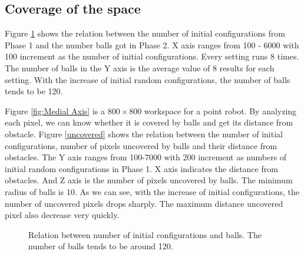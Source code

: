 \documentclass[11pt]{article}
\begin{document}
\subsection{Coverage of the space}

\indent\indent Figure \ref{PvB} shows the relation between the number of initial configurations from Phase 1 and the number balls got in Phase 2. X axis ranges from  100 - 6000 with 100 increment as the number of initial configurations. Every setting runs 8 times. The number of balls in the Y axis is the average value of 8 results for each setting. With the increase of initial random configurations, the number of balls tends to be 120. 

\indent Figure \ref{fig:Medial Axis} is a $800\times 800$ workspace for a point robot. By analyzing each pixel, we can know whether it is covered by balls and get its distance from obstacle. Figure \ref{uncovered} shows the relation between the number of initial configurations, number of pixels uncovered by balls and their distance from obstacles. The Y axis ranges from 100-7000 with 200 increment as numbers of initial random configurations in Phase 1. X axis indicates the distance from obstacles. And Z axis is the number of pixels uncovered by balls. The minimum radius of balls is 10. As we can see, with the increase of initial configurations, the number of uncovered pixels drops sharply. The maximum distance uncovered pixel also decrease very quickly.

\begin{figure}
	\caption{\label{PvB}} Relation between number of initial configurations and balls. The number of balls tends to be around 120.
\end{figure}
\end{document}
